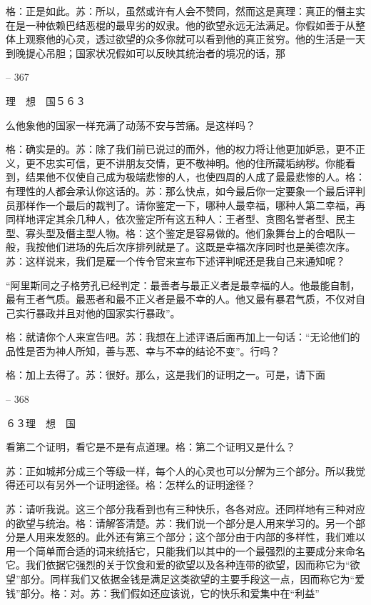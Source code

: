 \documentclass[11pt,oneside]{book}
\begin{document}
\begin{common-format}
    格：正是如此。苏：所以，虽然或许有人会不赞同，然而这是真理：真正的僭主实在是一种依赖巴结恶棍的最卑劣的奴隶。他的欲望永远无法满足。你假如善于从整体上观察他的心灵，透过欲望的众多你就可以看到他的真正贫穷。他的生活是一天到晚提心吊胆；国家状况假如可以反映其统治者的境况的话，那

    

-- 367

    理　想　国５６３

    么他象他的国家一样充满了动荡不安与苦痛。是这样吗？

    格：确实是的。苏：除了我们前已说过的而外，他的权力将让他更加妒忌，更不正义，更不忠实可信，更不讲朋友交情，更不敬神明。他的住所藏垢纳秽。你能看到，结果他不仅使自己成为极端悲惨的人，也使四周的人成了最最悲惨的人。格：有理性的人都会承认你这话的。苏：那么快点，如今最后你一定要象一个最后评判员那样作一个最后的裁判了。请你鉴定一下，哪种人最幸福，哪种人第二幸福，再同样地评定其余几种人，依次鉴定所有这五种人：王者型、贪图名誉者型、民主型、寡头型及僭主型人物。格：这个鉴定是容易做的。他们象舞台上的合唱队一般，我按他们进场的先后次序排列就是了。这既是幸福次序同时也是美德次序。苏：这样说来，我们是雇一个传令官来宣布下述评判呢还是我自己来通知呢？

    “阿里斯同之子格劳孔已经判定：最善者与最正义者是最幸福的人。他最能自制，最有王者气质。最恶者和最不正义者是最不幸的人。他又最有暴君气质，不仅对自己实行暴政并且对他的国家实行暴政”。

    格：就请你个人来宣告吧。苏：我想在上述评语后面再加上一句话：“无论他们的品性是否为神人所知，善与恶、幸与不幸的结论不变”。行吗？

    格：加上去得了。苏：很好。那么，这是我们的证明之一。可是，请下面

    

-- 368

    ６３理　想　国

    看第二个证明，看它是不是有点道理。格：第二个证明又是什么？

    苏：正如城邦分成三个等级一样，每个人的心灵也可以分解为三个部分。所以我觉得还可以有另外一个证明途径。格：怎样么的证明途径？

    苏：请听我说。这三个部分我看到也有三种快乐，各各对应。还同样地有三种对应的欲望与统治。格：请解答清楚。苏：我们说一个部分是人用来学习的。另一个部分是人用来发怒的。此外还有第三个部分；这个部分由于内部的多样性，我们难以用一个简单而合适的词来统括它，只能我们以其中的一个最强烈的主要成分来命名它。我们依据它强烈的关于饮食和爱的欲望以及各种连带的欲望，因而称它为“欲望”部分。同样我们又依据金钱是满足这类欲望的主要手段这一点，因而称它为“爱钱”部分。格：对。苏：我们假如还应该说，它的快乐和爱集中在“利益”


\end{common-format}
\end{document}
